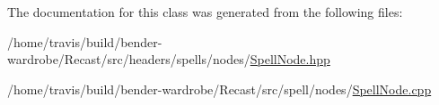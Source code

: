 The documentation for this class was generated from the following files\-:\begin{DoxyCompactItemize}
\item 
/home/travis/build/bender-\/wardrobe/\-Recast/src/headers/spells/nodes/\hyperlink{_spell_node_8hpp}{Spell\-Node.\-hpp}\item 
/home/travis/build/bender-\/wardrobe/\-Recast/src/spell/nodes/\hyperlink{_spell_node_8cpp}{Spell\-Node.\-cpp}\end{DoxyCompactItemize}
